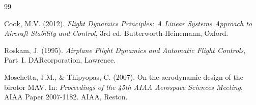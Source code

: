 ﻿\documentclass[12pt,a4paper]{article}
\theoremstyle{remark}
\begin{document}
\begin{thebibliography}{99}

		Cook, M.V. (2012). \textit{Flight Dynamics Principles: A Linear Systems Approach to Aircraft Stability and Control}, 3rd ed. Butterworth-Heinemann, Oxford.

		Roskam, J. (1995). \textit{Airplane Flight Dynamics and Automatic Flight Controls}, Part~I. DARcorporation, Lawrence.

		Moschetta, J.M., \& Thipyopas, C. (2007). On the aerodynamic design of the birotor MAV. In: \textit{Proceedings of the 45th AIAA Aerospace Sciences Meeting}, AIAA Paper 2007-1182. AIAA, Reston.

	\end{thebibliography}
	
\end{document}
